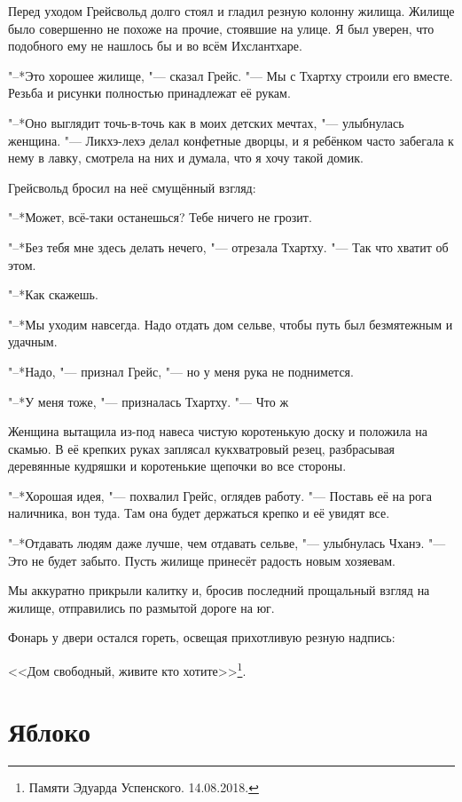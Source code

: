 \documentclass[a4paper,10pt]{book}
\newcommand{\ldotst}{\so{...}\xspace}
\begin{document}
 Перед уходом Грейсвольд долго стоял и гладил резную колонну жилища. Жилище было совершенно не похоже на прочие, стоявшие на улице. Я был уверен, что подобного ему не нашлось бы и во всём Ихслантхаре.

"--*Это хорошее жилище, "--- сказал Грейс. "--- Мы с Тхартху строили его вместе. Резьба и рисунки полностью принадлежат её рукам.

"--*Оно выглядит точь-в-точь как в моих детских мечтах, "--- улыбнулась женщина. "--- Ликхэ-лехэ делал конфетные дворцы, и я ребёнком часто забегала к нему в лавку, смотрела на них и думала, что я хочу такой домик.

Грейсвольд бросил на неё смущённый взгляд:

"--*Может, всё-таки останешься? Тебе ничего не грозит.

"--*Без тебя мне здесь делать нечего, "--- отрезала Тхартху. "--- Так что хватит об этом.

"--*Как скажешь.

"--*Мы уходим навсегда. Надо отдать дом сельве, чтобы путь был безмятежным и удачным.

"--*Надо, "--- признал Грейс, "--- но у меня рука не поднимется.

"--*У меня тоже, "--- призналась Тхартху. "--- Что ж\ldotst

Женщина вытащила из-под навеса чистую коротенькую доску и положила на скамью. В её крепких руках заплясал кукхватровый резец, разбрасывая деревянные кудряшки и коротенькие щепочки во все стороны.

"--*Хорошая идея, "--- похвалил Грейс, оглядев работу. "--- Поставь её на рога наличника, вон туда. Там она будет держаться крепко и её увидят все.

"--*Отдавать людям даже лучше, чем отдавать сельве, "--- улыбнулась Чханэ. "--- Это не будет забыто. Пусть жилище принесёт радость новым хозяевам.

Мы аккуратно прикрыли калитку и, бросив последний прощальный взгляд на жилище, отправились по размытой дороге на юг.

Фонарь у двери остался гореть, освещая прихотливую резную надпись:

<<Дом свободный, живите кто хотите>>\footnote{Памяти Эдуарда Успенского. 14.08.2018.}.
 
 \section{Яблоко}
\end{document}
